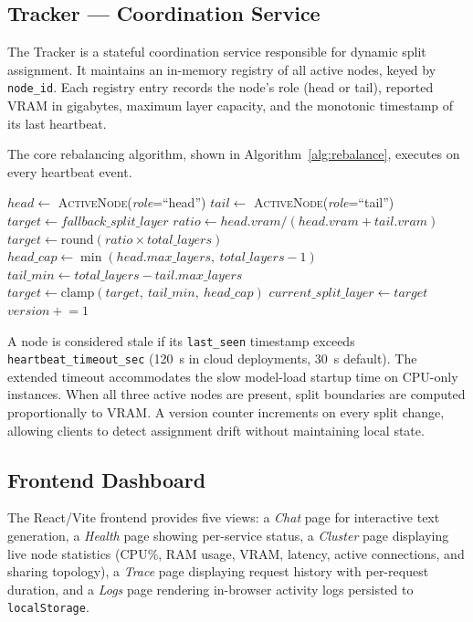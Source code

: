 \documentclass[conference]{IEEEtran}
\begin{document}
\subsection{Tracker --- Coordination Service}

The Tracker is a stateful coordination service responsible for dynamic split
assignment. It maintains an in-memory registry of all active nodes, keyed by
\texttt{node\_id}. Each registry entry records the node's role (head or tail),
reported VRAM in gigabytes, maximum layer capacity, and the monotonic timestamp
of its last heartbeat.

The core rebalancing algorithm, shown in Algorithm~\ref{alg:rebalance},
executes on every heartbeat event.

\begin{algorithm}[htbp]
\caption{Tracker Rebalance Algorithm}
\label{alg:rebalance}
\begin{algorithmic}[1]
\STATE $head \leftarrow$ \textsc{ActiveNode}(\textit{role}=``head'')
\STATE $tail \leftarrow$ \textsc{ActiveNode}(\textit{role}=``tail'')
  \STATE $target \leftarrow fallback\_split\_layer$
\ELSE
  \STATE $ratio \leftarrow head.vram / (head.vram + tail.vram)$
  \STATE $target \leftarrow \text{round}(ratio \times total\_layers)$
  \STATE $head\_cap \leftarrow \min(head.max\_layers,\ total\_layers - 1)$
  \STATE $tail\_min \leftarrow total\_layers - tail.max\_layers$
  \STATE $target \leftarrow \text{clamp}(target,\ tail\_min,\ head\_cap)$
\ENDIF
{}
  \STATE $current\_split\_layer \leftarrow target$
  \STATE $version \mathrel{+}= 1$
\ENDIF
\end{algorithmic}
\end{algorithm}

A node is considered stale if its \texttt{last\_seen} timestamp exceeds
\texttt{heartbeat\_timeout\_sec} (120~s in cloud deployments, 30~s default).
The extended timeout accommodates the slow model-load startup time on CPU-only
instances. When all three active nodes are present, split boundaries are
computed proportionally to VRAM. A version counter increments on every split
change, allowing clients to detect assignment drift without maintaining local
state.

\subsection{Frontend Dashboard}

The React/Vite frontend provides five views: a \emph{Chat} page for interactive
text generation, a \emph{Health} page showing per-service status, a
\emph{Cluster} page displaying live node statistics (CPU\%, RAM usage, VRAM,
latency, active connections, and sharing topology), a \emph{Trace} page
displaying request history with per-request duration, and a \emph{Logs} page
rendering in-browser activity logs persisted to \texttt{localStorage}.
\end{document}
